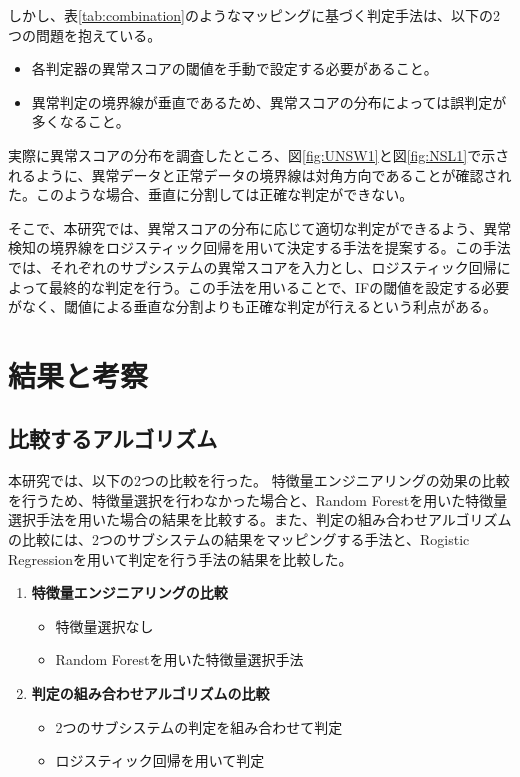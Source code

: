 \documentclass{css}
\begin{document}
しかし、表\ref{tab:combination}のようなマッピングに基づく判定手法は、以下の2つの問題を抱えている。
\begin{itemize}
\item 各判定器の異常スコアの閾値を手動で設定する必要があること。
\item 異常判定の境界線が垂直であるため、異常スコアの分布によっては誤判定が多くなること。
\end{itemize}
実際に異常スコアの分布を調査したところ、図\ref{fig:UNSW1}と図\ref{fig:NSL1}で示されるように、異常データと正常データの境界線は対角方向であることが確認された。このような場合、垂直に分割しては正確な判定ができない。

そこで、本研究では、異常スコアの分布に応じて適切な判定ができるよう、異常検知の境界線をロジスティック回帰を用いて決定する手法を提案する。この手法では、それぞれのサブシステムの異常スコアを入力とし、ロジスティック回帰によって最終的な判定を行う。この手法を用いることで、IFの閾値を設定する必要がなく、閾値による垂直な分割よりも正確な判定が行えるという利点がある。

\section{結果と考察}

\subsection{比較するアルゴリズム}

本研究では、以下の2つの比較を行った。
特徴量エンジニアリングの効果の比較を行うため、特徴量選択を行わなかった場合と、Random Forestを用いた特徴量選択手法を用いた場合の結果を比較する。また、判定の組み合わせアルゴリズムの比較には、2つのサブシステムの結果をマッピングする手法と、Rogistic Regressionを用いて判定を行う手法の結果を比較した。

\begin{enumerate}
    \item \textbf{特徴量エンジニアリングの比較}
        \begin{itemize}
            \item 特徴量選択なし
            \item Random Forestを用いた特徴量選択手法
        \end{itemize}
    \item \textbf{判定の組み合わせアルゴリズムの比較}
        \begin{itemize}
            \item 2つのサブシステムの判定を組み合わせて判定
            \item ロジスティック回帰を用いて判定
        \end{itemize}
\end{enumerate}
\end{document}
